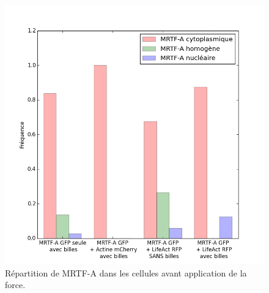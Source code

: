 \documentclass                                                                                                                                                                                                                                                                                                                                       {report}
\begin{document}
\begin{figure}[p]
\includegraphics[scale=0.4]{Figures/CHN_pinces.png} 
\caption{Répartition de MRTF-A dans les cellules avant application de la force. \label{CHN_pinces}}
\end{figure}
\end{document}
